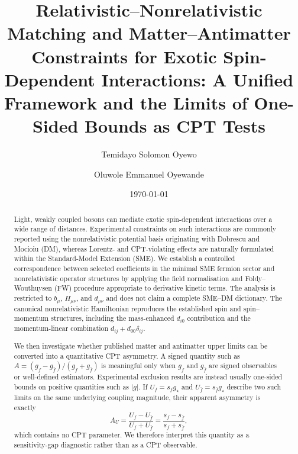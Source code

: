 \documentclass[aps,prd,reprint,superscriptaddress,nofootinbib]{revtex4-2}
\begin{document}
	
	\title{%
		Relativistic--Nonrelativistic Matching and Matter--Antimatter
		Constraints for Exotic Spin-Dependent Interactions:
		A Unified Framework and the Limits of One-Sided Bounds as CPT Tests
	}
	
	\author{Temidayo Solomon Oyewo}
	\author{Oluwole Emmanuel Oyewande}
	
	\date{\today}
	
	\begin{abstract}
		
		Light, weakly coupled bosons can mediate exotic spin-dependent
		interactions over a wide range of distances. Experimental constraints on
		such interactions are commonly reported using the nonrelativistic
		potential basis originating with Dobrescu and Mocioiu (DM), whereas
		Lorentz- and CPT-violating effects are naturally formulated within the
		Standard-Model Extension (SME). We establish a controlled correspondence
		between selected coefficients in the minimal SME fermion sector and
		nonrelativistic operator structures by applying the field normalisation
		and Foldy--Wouthuysen (FW) procedure appropriate to derivative
		kinetic terms. The analysis is restricted to $b_\mu$, $H_{\mu\nu}$, and
		$d_{\mu\nu}$ and does not claim a complete SME--DM dictionary. The
		canonical nonrelativistic Hamiltonian reproduces the established
		spin and spin--momentum structures, including the mass-enhanced
		$d_{i0}$ contribution and the momentum-linear combination
		$d_{ij}+d_{00}\delta_{ij}$.
		
		We then investigate whether published matter and antimatter upper limits
		can be converted into a quantitative CPT asymmetry. A signed quantity
		such as
		$A=(g_f-g_{\bar f})/(g_f+g_{\bar f})$
		is meaningful only when $g_f$ and $g_{\bar f}$ are signed observables or
		well-defined estimators. Experimental exclusion results are instead
		usually one-sided bounds on positive quantities such as $|g|$. If
		$U_f=s_f g_\star$ and $U_{\bar f}=s_{\bar f}g_\star$ describe two such
		limits on the same underlying coupling magnitude, their apparent
		asymmetry is exactly
		\[
		A_U=\frac{U_f-U_{\bar f}}{U_f+U_{\bar f}}
		=\frac{s_f-s_{\bar f}}{s_f+s_{\bar f}},
		\]
		which contains no CPT parameter. We therefore interpret this quantity
		as a sensitivity-gap diagnostic rather than as a CPT observable.
		

\end{abstract}
\end{document}
